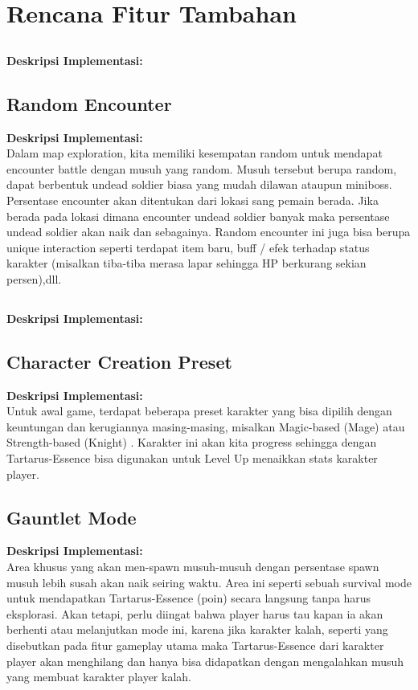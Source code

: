 \documentclass[12pt]{article}
\begin{document}
\section{Rencana Fitur Tambahan}
\subsection{}
\textbf{Deskripsi Implementasi:} \\


\subsection{Random Encounter}
\textbf{Deskripsi Implementasi:} \\
Dalam map exploration, kita memiliki kesempatan random untuk mendapat encounter battle dengan musuh yang random. Musuh tersebut berupa random, dapat berbentuk undead soldier biasa yang mudah dilawan ataupun miniboss. Persentase encounter akan ditentukan dari lokasi sang pemain berada. Jika berada pada lokasi dimana encounter undead soldier banyak maka persentase undead soldier akan naik dan sebagainya. Random encounter ini juga bisa berupa unique interaction seperti terdapat item baru, buff / efek terhadap status karakter (misalkan tiba-tiba merasa lapar sehingga HP berkurang sekian persen),dll.

\subsection{}
\textbf{Deskripsi Implementasi:} \\

\subsection{Character Creation Preset}
\textbf{Deskripsi Implementasi:} \\
Untuk awal game, terdapat beberapa preset karakter yang bisa dipilih dengan keuntungan dan kerugiannya masing-masing, misalkan Magic-based (Mage) atau Strength-based (Knight) . Karakter ini akan kita progress sehingga dengan Tartarus-Essence bisa digunakan untuk Level Up menaikkan stats karakter player.

\subsection{Gauntlet Mode}
\textbf{Deskripsi Implementasi:} \\
Area khusus yang akan men-spawn musuh-musuh dengan persentase spawn musuh lebih susah akan naik seiring waktu. Area ini seperti sebuah survival mode untuk mendapatkan Tartarus-Essence (poin) secara langsung tanpa harus eksplorasi. Akan tetapi, perlu diingat bahwa player harus tau kapan ia akan berhenti atau melanjutkan mode ini, karena jika karakter kalah, seperti yang disebutkan pada fitur gameplay utama maka Tartarus-Essence dari karakter player akan menghilang dan hanya bisa didapatkan dengan mengalahkan musuh yang membuat karakter player kalah.
\end{document}
